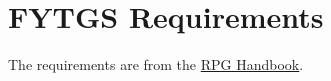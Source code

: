 \chapter{FYTGS Requirements}
\label{chap:thesis-preparation}

The requirements are from the \href{https://fytgs.hkust.edu.hk/academics/Academic-Regulations-and-Requirements/Handbook-for-Research-Postgraduate-Studies/guidelines-thesis-preparation}{RPG Handbook}.

